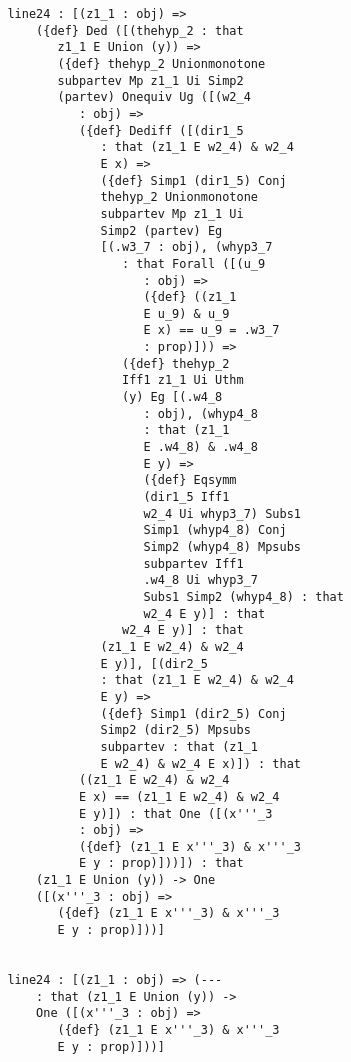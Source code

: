 \documentclass[12pt]{article}
\begin{document}
\begin{verbatim}
         line24 : [(z1_1 : obj) => 
             ({def} Ded ([(thehyp_2 : that 
                z1_1 E Union (y)) => 
                ({def} thehyp_2 Unionmonotone 
                subpartev Mp z1_1 Ui Simp2 
                (partev) Onequiv Ug ([(w2_4 
                   : obj) => 
                   ({def} Dediff ([(dir1_5 
                      : that (z1_1 E w2_4) & w2_4 
                      E x) => 
                      ({def} Simp1 (dir1_5) Conj 
                      thehyp_2 Unionmonotone 
                      subpartev Mp z1_1 Ui 
                      Simp2 (partev) Eg 
                      [(.w3_7 : obj), (whyp3_7 
                         : that Forall ([(u_9 
                            : obj) => 
                            ({def} ((z1_1 
                            E u_9) & u_9 
                            E x) == u_9 = .w3_7 
                            : prop)])) => 
                         ({def} thehyp_2 
                         Iff1 z1_1 Ui Uthm 
                         (y) Eg [(.w4_8 
                            : obj), (whyp4_8 
                            : that (z1_1 
                            E .w4_8) & .w4_8 
                            E y) => 
                            ({def} Eqsymm 
                            (dir1_5 Iff1 
                            w2_4 Ui whyp3_7) Subs1 
                            Simp1 (whyp4_8) Conj 
                            Simp2 (whyp4_8) Mpsubs 
                            subpartev Iff1 
                            .w4_8 Ui whyp3_7 
                            Subs1 Simp2 (whyp4_8) : that 
                            w2_4 E y)] : that 
                         w2_4 E y)] : that 
                      (z1_1 E w2_4) & w2_4 
                      E y)], [(dir2_5 
                      : that (z1_1 E w2_4) & w2_4 
                      E y) => 
                      ({def} Simp1 (dir2_5) Conj 
                      Simp2 (dir2_5) Mpsubs 
                      subpartev : that (z1_1 
                      E w2_4) & w2_4 E x)]) : that 
                   ((z1_1 E w2_4) & w2_4 
                   E x) == (z1_1 E w2_4) & w2_4 
                   E y)]) : that One ([(x'''_3 
                   : obj) => 
                   ({def} (z1_1 E x'''_3) & x'''_3 
                   E y : prop)]))]) : that 
             (z1_1 E Union (y)) -> One 
             ([(x'''_3 : obj) => 
                ({def} (z1_1 E x'''_3) & x'''_3 
                E y : prop)]))]


         line24 : [(z1_1 : obj) => (--- 
             : that (z1_1 E Union (y)) -> 
             One ([(x'''_3 : obj) => 
                ({def} (z1_1 E x'''_3) & x'''_3 
                E y : prop)]))]



\end{verbatim}
\end{document}
